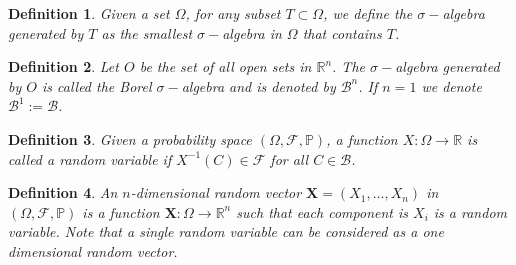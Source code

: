 \documentclass[12pt]{book}
\newtheorem{definition}{Definition}
\newcommand{\p}{\mathbb{P}}
\begin{document}
\begin{definition}
Given a set $\Omega$, for any subset $T\subset\Omega$, we define the $\sigma-$algebra generated by $T$ as
the smallest $\sigma-$algebra in $\Omega$ that contains $T$.
\end{definition}

\begin{definition}
Let $O$ be the set of all open sets in $\mathbb{R}^{n}$. The $\sigma-$algebra generated by $O$ is called
the Borel $\sigma-$algebra and is denoted by $\mathcal{B}^{n}$. If $n=1$ we denote 
$\mathcal{B}^{1}:=\mathcal{B}$.
\end{definition}

\begin{definition}
Given a probability space $(\Omega,\mathscr{F},\p)$, a function $X:\Omega\rightarrow\mathbb{R}$ is called 
a random variable
if $X^{-1}(C)\in\mathscr{F}$ for all $C\in\mathcal{B}$.
\end{definition}

\begin{definition}
 An $n$-dimensional random vector $\textbf{X}=(X_{1},\ldots,X_{n})$ in $(\Omega,\mathscr{F},\p)$ 
is a function $\textbf{X}:\Omega\rightarrow\mathbb{R}^{n}$ such that each component is $X_{i}$ is a random variable. 
Note that a single random variable can be considered as a one dimensional random vector.
\end{definition}
\end{document}
